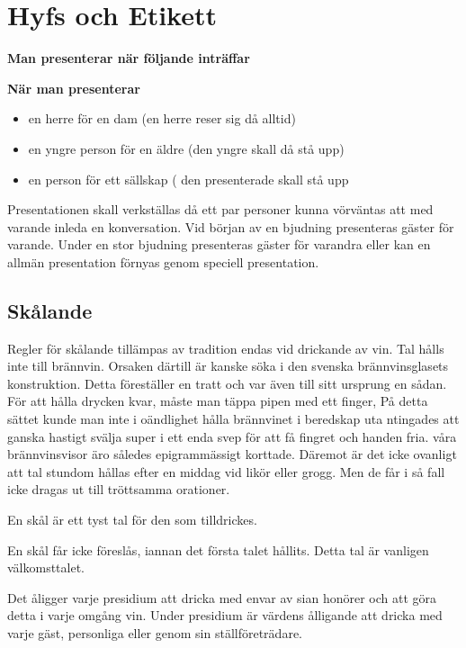 \pagestyle{Hyfs och Etikett}

\section{\textbf{Hyfs och Etikett}}

\textbf{Man presenterar när följande inträffar}

\textbf{När man presenterar}

\begin{itemize}
    \item en herre för en dam (en herre reser sig då alltid)
    \item en yngre person för en äldre (den yngre skall då stå upp)
    \item en person för ett sällskap ( den presenterade skall stå upp
\end{itemize}

Presentationen skall verkställas då ett par personer kunna vörväntas att med varande inleda en konversation. Vid början av en bjudning presenteras gäster för varande. Under en stor bjudning presenteras gäster för varandra eller kan en allmän presentation förnyas genom speciell presentation.

\subsection{\textbf{Skålande}}

Regler för skålande tillämpas av tradition endas vid drickande av vin. Tal hålls inte till brännvin. Orsaken därtill är kanske söka i den svenska brännvinsglasets konstruktion. Detta föreställer en tratt och var även till sitt ursprung en sådan. För att hålla drycken kvar, måste man täppa pipen med ett finger, På detta sättet kunde man inte i oändlighet hålla brännvinet i beredskap uta ntingades att ganska hastigt svälja super i ett enda svep för att få fingret och handen fria. våra brännvinsvisor äro således epigrammässigt korttade. Däremot är det icke ovanligt att tal stundom hållas efter en middag vid likör eller grogg. Men de får i så fall icke dragas ut till tröttsamma orationer.

En skål är ett tyst tal för den som tilldrickes.

En skål får icke föreslås, iannan det första talet hållits. Detta tal är vanligen välkomsttalet.

Det åligger varje presidium att dricka med envar av sian honörer och att göra detta i varje omgång vin. Under presidium är värdens ålligande att dricka med varje gäst, personliga eller genom sin ställföreträdare.

